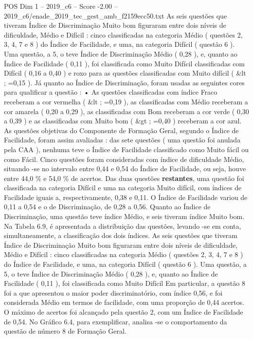 \begin{textsample}{POS Dim 1 – 2019\_c6 – Score -2.00 – 2019\_c6/enade\_2019\_tec\_gest\_amb\_f2159ecc50.txt}
As seis questões que tiveram Índice de Discriminação Muito bom figuraram entre dois níveis de dificuldade, Médio e Difícil : cinco classificadas na categoria Médio ( questões 2, 3, 4, 7 e 8 ) do Índice de Facilidade, e uma, na categoria Difícil ( questão 6 ).
Uma questão, a 5, o teve Índice de Discriminação Médio ( 0,28 ), e, quanto ao Índice de Facilidade ( 0,11 ), foi classificada como Muito Difícil classificadas com Difícil ( 0,16 a 0,40 ) e roxo para as questões classificadas com Muito difícil ( \&lt ; =0,15 ).
Já quanto ao Índice de Discriminação, foram usadas as seguintes cores para qualificar a questão : • As questões classificadas com índice Fraco receberam a cor vermelha ( \&lt ; =0,19 ), as classificadas com Médio receberam a cor amarela ( 0,20 a 0,29 ), as classificadas com Bom receberam a cor verde ( 0,30 a 0,39 ) e as classificadas com Muito bom ( \&gt ; =0,40 ) receberam a cor azul.
As questões objetivas do Componente de Formação Geral, segundo o Índice de Facilidade, foram assim avaliadas : das sete questões ( uma questão foi anulada pela CAA ), nenhuma teve o Índice de Facilidade classificado como Muito fácil ou como Fácil.
Cinco questões foram consideradas com índice de dificuldade Médio, situando -se no intervalo entre 0,44 e 0,54 do Índice de Facilidade, ou seja, houve entre 44,0 \% e 54,0 \% de acertos.
Das duas questões \textbf{restantes}, uma questão foi classificada na categoria Difícil e uma na categoria Muito difícil, com índices de Facilidade iguais a, respectivamente, 0,38 e 0,11.
O Índice de Facilidade variou de 0,11 a 0,54 e o de Discriminação, de 0,28 a 0,56.
Quanto ao Índice de Discriminação, uma questão teve índice Médio, e seis tiveram índice Muito bom.
Na Tabela 6.9, é apresentada a distribuição das questões, levando -se em conta, simultaneamente, a classificação dos dois índices.
As seis questões que tiveram Índice de Discriminação Muito bom figuraram entre dois níveis de dificuldade, Médio e Difícil : cinco classificadas na categoria Médio ( questões 2, 3, 4, 7 e 8 ) do Índice de Facilidade, e uma, na categoria Difícil ( questão 6 ).
Uma questão, a 5, o teve Índice de Discriminação Médio ( 0,28 ), e, quanto ao Índice de Facilidade ( 0,11 ), foi classificada como Muito Difícil Em particular, a questão 8 foi a que apresentou o maior poder discriminatório, com índice 0,56, e foi considerada Médio em termos de facilidade, com uma proporção de 0,44 acertos.
O máximo de acertos foi alcançado pela questão 2, com um Índice de Facilidade de 0,54.
No Gráfico 6.4, para exemplificar, analisa -se o comportamento da questão de número 8 de Formação Geral.

\end{textsample}

